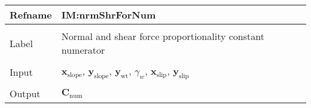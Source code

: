 \documentclass[12pt]{article}
\begin{document}
\vspace{\baselineskip}
\noindent
\begin{minipage}{\textwidth}
\begin{tabular}{>{\raggedright}p{}>{\raggedright\arraybackslash}p{}}
\toprule \textbf{Refname} & \textbf{IM:nrmShrForNum}
\label{IM:nrmShrForNum}
\\ \midrule \\
Label & Normal and shear force proportionality constant numerator
        
\\ \midrule \\
Input & ${\symbf{x}_{\text{slope}}}$, ${\symbf{y}_{\text{slope}}}$, ${\symbf{y}_{\text{wt}}}$, ${γ_{w}}$, ${\symbf{x}_{\text{slip}}}$, ${\symbf{y}_{\text{slip}}}$
        
\\ \midrule \\
Output & ${\symbf{C}_{\text{num}}}$
         

\end{tabular}
\end{minipage}
\end{document}
